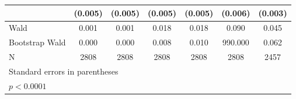 \begin{table}[htbp]
\begin{tabular}{l*{6}{c}}
                    &     (0.005)       &     (0.005)       &     (0.005)       &     (0.005)       &     (0.006)       &     (0.003)       \\
\hline
Wald                &       0.001       &       0.001       &       0.018       &       0.018       &       0.090       &       0.045       \\
Bootstrap Wald      &       0.000       &       0.000       &       0.008       &       0.010       &     990.000       &       0.062       \\
N                   &        2808       &        2808       &        2808       &        2808       &        2808       &        2457       \\
\hline\hline
\multicolumn{7}{l}{\footnotesize Standard errors in parentheses}\\
\multicolumn{7}{l}{\footnotesize \sym{*} \(p<0.0001\)}\\
\end{tabular}
\end{table}
